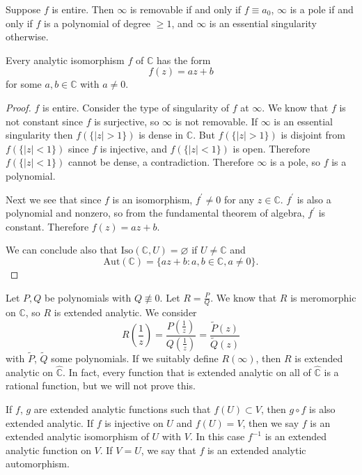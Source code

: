 Suppose $f$ is entire. Then $\infty$ is removable if and only if
$f \equiv a_0$, $\infty$ is a pole if and only if $f$ is a polynomial
of degree $\geq 1$, and $\infty$ is an essential singularity
otherwise.

\begin{lemma}
Every analytic isomorphism $f$ of $\mathbb{C}$ has the form
$$
f(z) = a z + b
$$
for some $a, b \in \mathbb{C}$ with $a \neq 0$.
\end{lemma}

\begin{proof}
$f$ is entire. Consider the type of singularity of $f$ at $\infty$.
We know that $f$ is not constant since $f$ is surjective,
so $\infty$ is not removable. If $\infty$ is an essential singularity
then $f(\{ |z| > 1 \})$ is dense in $\mathbb{C}$. But
$f(\{ |z| > 1 \})$ is disjoint from $f(\{ |z| < 1 \})$ since $f$ is
injective, and $f(\{ |z| < 1 \})$ is open. Therefore $f(\{|z| < 1\})$
cannot be dense, a contradiction. Therefore $\infty$ is a pole, so
$f$ is a polynomial.

Next we see that since $f$ is an isomorphism, $f^\prime \neq 0$ for
any $z \in \mathbb{C}$. $f^\prime$ is also a polynomial and nonzero,
so from the fundamental theorem of algebra, $f^\prime$ is constant.
Therefore $f(z) = az + b$.

We can conclude also that
$\mathrm{Iso}(\mathbb{C}, U) = \varnothing$ if $U \neq \mathbb{C}$
and
$$
  \mathrm{Aut}(\mathbb{C})
= \{ az + b : a, b \in \mathbb{C}, a \neq 0 \}.
$$
\end{proof}

Let $P, Q$ be polynomials with $Q \not\equiv 0$. Let
$R = \frac{P}{Q}$. We know that $R$ is meromorphic on $\mathbb{C}$,
so $R$ is extended analytic. We consider
$$
  R\left(\frac{1}{z}\right)
= \frac{P\left(\frac{1}{z}\right)}
       {Q\left(\frac{1}{z}\right)}
= \frac{\tilde{P}(z)}
       {\tilde{Q}(z)}
$$
with $\tilde{P}$, $\tilde{Q}$ some polynomials. If we suitably
define $R(\infty)$, then $R$ is extended analytic on
$\hat{\mathbb{C}}$. In fact, every function that is extended
analytic on all of $\hat{\mathbb{C}}$ is a rational function,
but we will not prove this.

If $f$, $g$ are extended analytic functions such that
$f(U) \subset V$, then $g \circ f$ is also extended analytic.
If $f$ is injective on $U$ and $f(U) = V$, then we say
$f$ is an extended analytic isomorphism of $U$ with $V$.
In this case $f^{-1}$ is an extended analytic function on $V$.
If $V = U$, we say that $f$ is an extended analytic automorphism.

